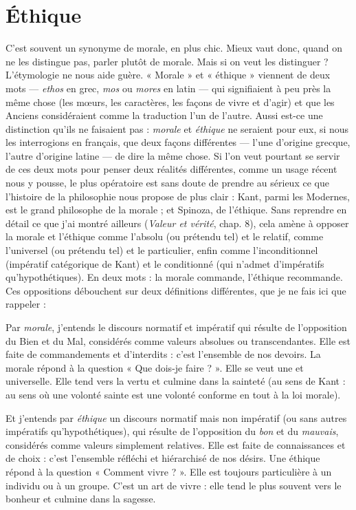 \section{Éthique}
C’est souvent un synonyme de morale, en plus chic. Mieux vaut
donc, quand on ne les distingue pas, parler plutôt de morale.
Mais si on veut les distinguer ? L’étymologie ne nous aide guère. « Morale » et
« éthique » viennent de deux mots — {\it ethos} en grec, {\it mos} ou {\it mores} en latin — qui
signifiaient à peu près la même chose (les mœurs, les caractères, les façons de
vivre et d’agir) et que les Anciens considéraient comme la traduction l’un de
l’autre. Aussi est-ce une distinction qu’ils ne faisaient pas : {\it morale} et {\it éthique} ne
seraient pour eux, si nous les interrogions en français, que deux façons différentes —
l’une d’origine grecque, l’autre d’origine latine — de dire la même
chose. Si l’on veut pourtant se servir de ces deux mots pour penser deux réalités
différentes, comme un usage récent nous y pousse, le plus opératoire est sans
doute de prendre au sérieux ce que l’histoire de la philosophie nous propose de
plus clair : Kant, parmi les Modernes, est le grand philosophe de la morale ; et
Spinoza, de l'éthique. Sans reprendre en détail ce que j'ai montré ailleurs
({\it Valeur et vérité}, chap. 8), cela amène à opposer la morale et l’éthique comme
l'absolu (ou prétendu tel) et le relatif, comme l’universel (ou prétendu tel) et le
particulier, enfin comme l’inconditionnel (impératif catégorique de Kant) et
le conditionné (qui n’admet d’impératifs qu'hypothétiques). En deux mots : la
morale commande, l'éthique recommande. Ces oppositions débouchent sur
deux définitions différentes, que je ne fais ici que rappeler :

Par {\it morale}, j'entends le discours normatif et impératif qui résulte de
l’opposition du Bien et du Mal, considérés comme valeurs absolues ou transcendantes.
Elle est faite de commandements et d’interdits : c’est l’ensemble de
nos devoirs. La morale répond à la question « Que dois-je faire ? ». Elle se veut
une et universelle. Elle tend vers la vertu et culmine dans la sainteté (au sens de
Kant : au sens où une volonté sainte est une volonté conforme en tout à la loi
morale).

Et j'entends par {\it éthique} un discours normatif mais non impératif (ou sans
autres impératifs qu'hypothétiques), qui résulte de l'opposition du {\it bon} et du
{\it mauvais}, considérés comme valeurs simplement relatives. Elle est faite de
connaissances et de choix : c’est l’ensemble réfléchi et hiérarchisé de nos désirs.
Une éthique répond à la question « Comment vivre ? ». Elle est toujours particulière
à un individu ou à un groupe. C’est un art de vivre : elle tend le plus
souvent vers le bonheur et culmine dans la sagesse.

